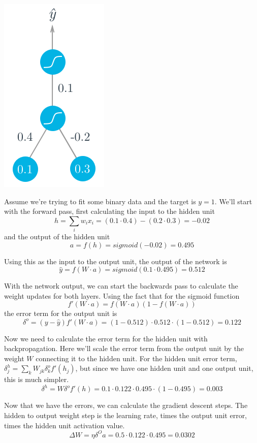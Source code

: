 \includegraphics[width=0.5\linewidth]{img//intro//backprop-network.png}

Assume we're trying to fit some binary data and the target is \(y = 1\). We'll start with the forward pass, first calculating the input to the hidden unit \[h = \sum_i w_i x_i = (0.1 \cdot 0.4) - (0.2 \cdot 0.3) = -0.02\]
and the output of the hidden unit \[a = f(h) = sigmoid(-0.02) = 0.495\]

Using this as the input to the output unit, the output of the network is \[\hat{y} = f(W \cdot a) = sigmoid(0.1 \cdot 0.495) = 0.512\]

With the network output, we can start the backwards pass to calculate the weight updates for both layers. Using the fact that for the sigmoid function \[f'(W \cdot a) = f(W \cdot a)(1 - f(W \cdot a))\]
the error term for the output unit is \[\delta^o = (y-\hat{y})f'(W \cdot a) = (1 - 0.512) \cdot 0.512 \cdot (1-0.512) = 0.122\]

Now we need to calculate the error term for the hidden unit with backpropagation. Here we'll scale the error term from the output unit by the weight \(W\) connecting it to the hidden unit. For the hidden unit error term, \(\delta_j^h = \sum_k W_{jk} \delta_k^o f'(h_j)\), but since we have one hidden unit and one output unit, this is much simpler. \[\delta^h = W \delta^o f'(h) = 0.1 \cdot 0.122 \cdot 0.495 \cdot (1 - 0.495) = 0.003\]

Now that we have the errors, we can calculate the gradient descent steps. The hidden to output weight step is the learning rate, times the output unit error, times the hidden unit activation value. \[\Delta W = \eta \delta^O a = 0.5 \cdot 0.122 \cdot 0.495 = 0.0302\]

